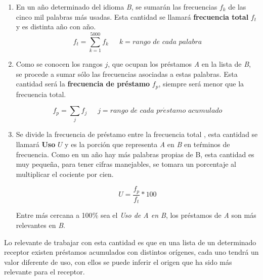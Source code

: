 \begin{enumerate}
	
	\item En un año determinado del idioma \textit{B}, se sumarán las
	frecuencias $f_{k}$ de las cinco mil palabras más usadas.  Esta
	cantidad se llamará \textbf{frecuencia total} $f_{t}$ y es distinta año
	con año. 
	\begin{equation}
	\label{ec.ftot}
	f_{t} = \sum_{k=1}^{5000} f_{k} \,\,\,\,\,\,\,\,\, k = rango\,\, de \,\,cada \,\,palabra
	\end{equation}
	\item Como se conocen los rangos $j$,  que ocupan los préstamos \textit{A} en la lista de \textit{B}, se procede a sumar sólo las frecuencias asociadas a estas palabras. Esta cantidad será la \textbf{frecuencia de préstamo} $f_{p}$,  siempre será menor que la frecuencia total.
	
	\begin{equation}
	\label{ec.fpres}
	f_{p} = \sum_{j} f_{j} \,\,\,\,\,\,\,\,\, j = rango\,\, de \,\,cada \,\,pr\acute{e}stamo\,\,acumulado
	\end{equation}
	
	
	\item  Se divide la frecuencia de préstamo entre la frecuencia total , esta cantidad se llamará  \textbf{Uso} $U$ y es la porción que representa \textit{A} en \textit{B} en teŕminos de frecuencia.  Como en un año hay más palabras propias de B, esta cantidad es muy pequeña, para tener cifras manejables, se tomara un porcentaje al multiplicar el cociente por cien.  

	\begin{equation}
	\label{ec.fuso}
	 U = \frac{f_{p}}{f_{t}} * 100
	\end{equation}
	
	
	Entre más cercana a 100$\%$ sea el \textit{Uso de A en B}, los préstamos de \textit{A} son más relevantes en \textit{B}.

\end{enumerate}

Lo relevante de trabajar con esta cantidad es que en una lista de un determinado receptor existen préstamos acumulados con distintos orígenes, cada uno tendrá un valor diferente de uso, con ellos se puede inferir el origen que ha sido más relevante para el receptor. 



